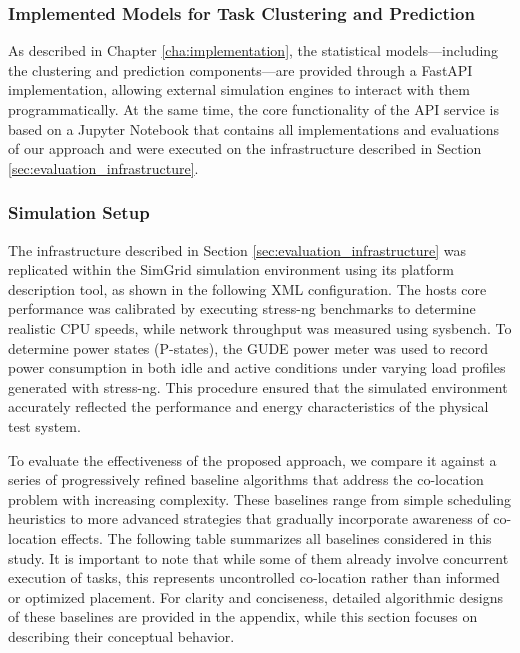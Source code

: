 \subsubsection{Implemented Models for Task Clustering and Prediction}
\label{sec:evaluation_statistical_learning_methods}
As described in Chapter \ref{cha:implementation}, the statistical models—including the clustering and prediction components—are provided through a FastAPI implementation, allowing external simulation engines to interact with them programmatically. At the same time, the core functionality of the API service is based on a Jupyter Notebook that contains all implementations and evaluations of our approach and were executed on the infrastructure described in Section \ref{sec:evaluation_infrastructure}.

\subsubsection{Simulation Setup}
\label{sec:evaluation_simulation}

The infrastructure described in Section \ref{sec:evaluation_infrastructure} was replicated within the SimGrid simulation environment using its platform description tool, as shown in the following XML configuration. The hosts core performance was calibrated by executing stress-ng benchmarks to determine realistic CPU speeds, while network throughput was measured using sysbench. To determine power states (P-states), the GUDE power meter was used to record power consumption in both idle and active conditions under varying load profiles generated with stress-ng. This procedure ensured that the simulated environment accurately reflected the performance and energy characteristics of the physical test system.




To evaluate the effectiveness of the proposed approach, we compare it against a series of progressively refined baseline algorithms that address the co-location problem with increasing complexity. These baselines range from simple scheduling heuristics to more advanced strategies that gradually incorporate awareness of co-location effects. The following table summarizes all baselines considered in this study. It is important to note that while some of them already involve concurrent execution of tasks, this represents uncontrolled co-location rather than informed or optimized placement. For clarity and conciseness, detailed algorithmic designs of these baselines are provided in the appendix, while this section focuses on describing their conceptual behavior.

